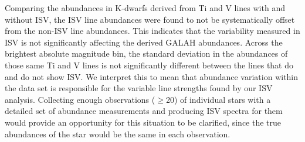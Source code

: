 Comparing the abundances in K-dwarfs derived from Ti and V lines with and without ISV, the ISV line abundances were found to not be systematically offset from the non-ISV line abundances. This indicates that the variability measured in ISV is not significantly affecting the derived GALAH abundances. Across the brightest absolute magnitude bin, the standard deviation in the abundances of those same Ti and V lines is not significantly different between the lines that do and do not show ISV. We interpret this to mean that abundance variation within the data set is responsible for the variable line strengths found by our ISV analysis. Collecting enough observations ($\geq$20) of individual stars with a detailed set of abundance measurements and producing ISV spectra for them would provide an opportunity for this situation to be clarified, since the true abundances of the star would be the same in each observation.\\